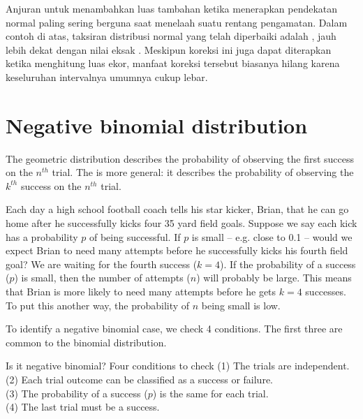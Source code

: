 Anjuran untuk menambahkan luas tambahan ketika menerapkan pendekatan
normal paling sering berguna saat menelaah suatu rentang pengamatan.
Dalam contoh di atas, taksiran distribusi normal yang telah diperbaiki
adalah \smokeABCNormalFixed{}, jauh lebih dekat dengan nilai eksak
\smokeABCBinom{}. Meskipun koreksi ini juga dapat diterapkan ketika
menghitung luas ekor, manfaat koreksi tersebut biasanya hilang karena
keseluruhan intervalnya umumnya cukup lebar.



{}




\section{Negative binomial distribution}
\label{negativeBinomial}


The geometric distribution describes the probability of observing the first success on the $n^{th}$ trial. The  is more general: it describes the probability of observing the $k^{th}$ success on the $n^{th}$ trial.

\begin{examplewrap}
\begin{nexample}{Each day a high school football coach tells his star kicker, Brian, that he can go home after he successfully kicks four 35 yard field goals. Suppose we say each kick has a probability $p$ of being successful. If $p$ is small -- e.g. close to 0.1 -- would we expect Brian to need many attempts before he successfully kicks his fourth field goal?}
We are waiting for the fourth success ($k=4$). If the probability of a success ($p$) is small, then the number of attempts ($n$) will probably be large. This means that Brian is more likely to need many attempts before he gets $k=4$ successes. To put this another way, the probability of $n$ being small is low.
\end{nexample}
\end{examplewrap}

To identify a negative binomial case, we check 4 conditions. The first three are common to the binomial distribution.

\begin{onebox}{Is it negative binomial? Four conditions to check}
(1) The trials are independent. \\
(2) Each trial outcome can be classified as a success or failure. \\
(3) The probability of a success ($p$) is the same for each trial. \\
(4) The last trial must be a success.
\end{onebox}

